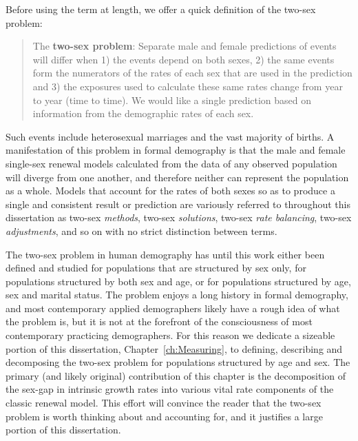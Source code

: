 
Before using the term at length, we offer a quick definition of the two-sex
problem:

\begin{singlespace}
\begin{quote}
The \textbf{two-sex problem}: Separate male and female predictions of events
will differ when 1) the events depend on both sexes, 2) the same events 
form the numerators of the rates of each sex that are used in the prediction and
3) the exposures used to calculate these same rates change from year to year
(time to time). We would like a single prediction based on information from the
demographic rates of each sex.
\end{quote}
\end{singlespace}

 Such events include heterosexual marriages and the vast majority of births.
 A manifestation of this problem in formal demography is that the male
 and female single-sex renewal models calculated from the data of any observed 
 population will diverge from one another, and therefore neither can represent
 the population as a whole. Models that account for the rates of both sexes
 so as to produce a single and consistent result or prediction are
 variously referred to throughout this dissertation as two-sex \textit{methods},
 two-sex \textit{solutions}, two-sex \textit{rate balancing}, two-sex 
 \textit{adjustments}, and so on with no strict distinction between terms.
 
 The two-sex problem in human demography has until this work either been defined 
 and studied for populations that are structured by sex only, for populations
structured by both sex and age, or for populations structured by age, sex and
marital status. The problem enjoys a long history in formal demography, and most
contemporary applied demographers likely have a rough idea of what the problem
is, but it is not at the forefront of the consciousness of most contemporary
practicing demographers. For this reason we dedicate a sizeable portion of 
this dissertation, Chapter~\ref{ch:Measuring}, to defining, describing and
decomposing the two-sex problem for populations structured by age and sex. The
primary (and likely original) contribution of this chapter is the decomposition
of the sex-gap in intrinsic growth rates into various vital rate components of 
the classic renewal model. This effort will convince the reader that the two-sex
problem is worth thinking about and accounting for, and it justifies a large
portion of this dissertation.


